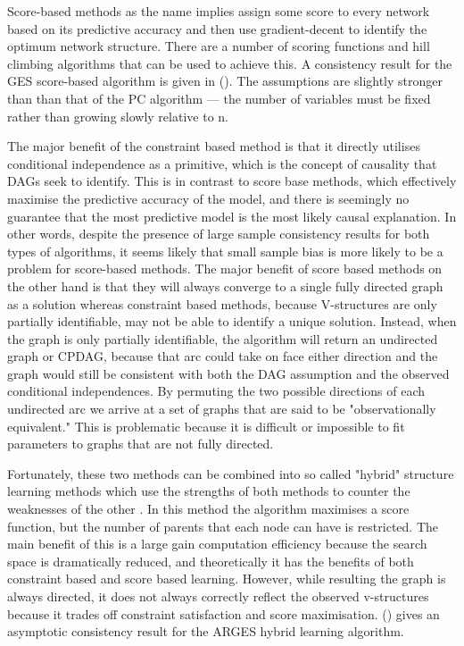 \documentclass{article}
\begin{document}
Score-based methods as the name implies assign some score to every network based on its predictive accuracy and then use gradient-decent to identify the optimum network structure. There are a number of scoring functions and hill climbing algorithms that can be used to achieve this. A consistency result for the GES score-based algorithm is given in \citeauthor{chickering2002optimal} (\citeyear{chickering2002optimal}). The assumptions are slightly stronger than than that of the PC algorithm --- the number of variables must be fixed rather than growing slowly relative to n.

The major benefit of the constraint based method is that it directly utilises conditional independence as a primitive, which is the concept of causality that DAGs seek to identify. This is in contrast to score base methods, which effectively maximise the predictive accuracy of the model, and there is seemingly no guarantee that the most predictive model is the most likely causal explanation. In other words, despite the presence of large sample consistency results for both types of algorithms, it seems likely that small sample bias is more likely to be a problem for score-based methods. The major benefit of score based methods on the other hand is that they will always converge to a single fully directed graph as a solution whereas constraint based methods, because V-structures are only partially identifiable, may not be able to identify a unique solution. Instead, when the graph is only partially identifiable, the algorithm will return an undirected graph or CPDAG, because that arc could take on face either direction and the graph would still be consistent with both the DAG assumption and the observed conditional independences. By permuting the two possible directions of each undirected arc we arrive at a set of graphs that are said to be "observationally equivalent." This is problematic because it is difficult or impossible to fit parameters to graphs that are not fully directed.  

Fortunately, these two methods can be combined into so called "hybrid" structure learning methods which use the strengths of both methods to counter the weaknesses of the other \parencite{scutari2014multiple} \parencite{friedman2013learning}. In this method the algorithm maximises a score function, but the number of parents that each node can have is restricted. The main benefit of this is a large gain computation efficiency because the search space is dramatically reduced, and theoretically it has the benefits of both constraint based and score based learning. However, while resulting the graph is always directed, it does not always correctly reflect the observed v-structures because it trades off constraint satisfaction and score maximisation. \citeauthor{nandy2018high} (\citeyear{nandy2018high}) gives an asymptotic consistency result for the ARGES hybrid learning algorithm.
\end{document}
